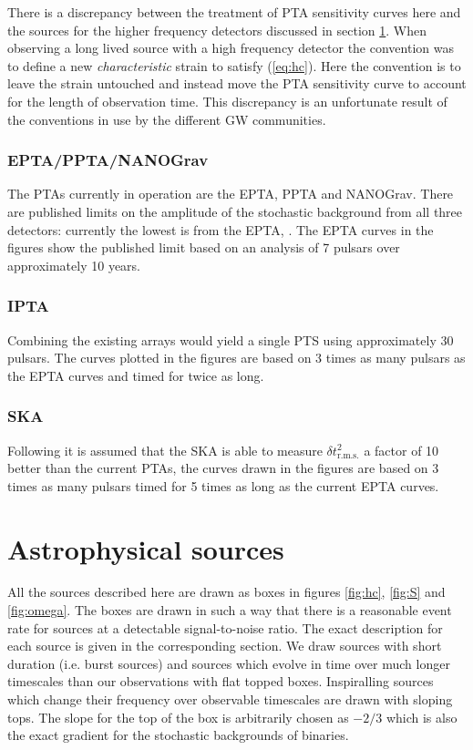 \documentclass[fleqn,12pt]{iopart}
\begin{document}
There is a discrepancy between the treatment of PTA sensitivity curves here and the sources for the higher frequency detectors discussed in section \ref{sec:sources}. When observing a long lived source with a high frequency detector the convention was to define a new \emph{characteristic} strain to satisfy (\ref{eq:hc}). Here the convention is to leave the strain untouched and instead move the PTA sensitivity curve to account for the length of observation time. This discrepancy is an unfortunate result of the conventions in use by the different GW communities.


\subsubsection{EPTA/PPTA/NANOGrav}
The PTAs currently in operation are the EPTA, PPTA and NANOGrav. There are published limits on the amplitude of the stochastic background from all three detectors: currently the lowest is from the EPTA, \cite{Haasteren}. The EPTA curves in the figures show the  published limit based on an analysis of 7 pulsars over approximately 10 years.

\subsubsection{IPTA}
Combining the existing arrays would yield a single PTS using approximately 30 pulsars. The curves plotted in the figures are based on 3 times as many pulsars as the EPTA curves and timed for twice as long.

\subsubsection{SKA}
Following \cite{SesanaVecchioColancino} it is assumed that the SKA is able to measure $\delta t^{2}_{\textrm{r.m.s.}}$ a factor of 10 better than the current PTAs, the curves drawn in the figures are based on 3 times as many pulsars timed for 5 times as long as the current EPTA curves.

\section{Astrophysical sources}\label{sec:sources}
All the sources described here are drawn as boxes in figures \ref{fig:hc}, \ref{fig:S} and \ref{fig:omega}. The boxes are drawn in such a way that there is a reasonable event rate for sources at a detectable signal-to-noise ratio. The exact description for each source is given in the corresponding section. We draw sources with short duration (i.e. burst sources) and sources which evolve in time over much longer timescales than our observations with flat topped boxes. Inspiralling sources which change their frequency over observable timescales are drawn with sloping tops. The slope for the top of the box is arbitrarily chosen as $-2/3$ which is also the exact gradient for the stochastic backgrounds of binaries. 
\end{document}
